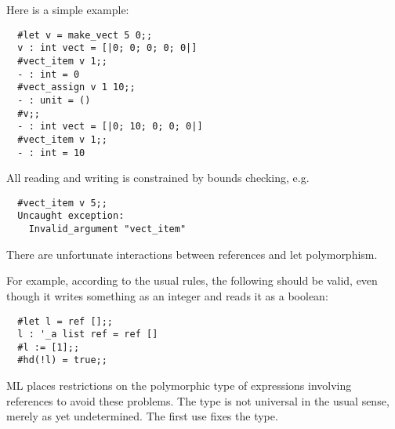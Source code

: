 \begin{slide*}


\vspace*{0.5cm}

Here is a simple example:

\begin{black}\begin{verbatim}
  #let v = make_vect 5 0;;
  v : int vect = [|0; 0; 0; 0; 0|]
  #vect_item v 1;;
  - : int = 0
  #vect_assign v 1 10;;
  - : unit = ()
  #v;;
  - : int vect = [|0; 10; 0; 0; 0|]
  #vect_item v 1;;
  - : int = 10
\end{verbatim}\end{black}

All reading and writing is constrained by bounds checking, e.g.

\begin{black}\begin{verbatim}
  #vect_item v 5;;
  Uncaught exception:
    Invalid_argument "vect_item"
\end{verbatim}\end{black}


\end{slide*}


\begin{slide*}


\vspace*{0.5cm}

There are unfortunate interactions between references and let polymorphism.

For example, according to the usual rules, the following should be valid, even
though it writes something as an integer and reads it as a boolean:

\begin{black}\begin{verbatim}
  #let l = ref [];;
  l : '_a list ref = ref []
  #l := [1];;
  #hd(!l) = true;;
\end{verbatim}\end{black}

ML places restrictions on the polymorphic type of expressions involving
references to avoid these problems. The type is not universal in the usual
sense, merely as yet undetermined. The first use fixes the type.

\end{slide*}






